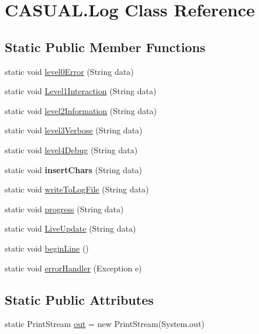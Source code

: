 \hypertarget{class_c_a_s_u_a_l_1_1_log}{\section{C\-A\-S\-U\-A\-L.\-Log Class Reference}
\label{class_c_a_s_u_a_l_1_1_log}
}
\subsection*{Static Public Member Functions}
\begin{DoxyCompactItemize}
\item 
static void \hyperlink{class_c_a_s_u_a_l_1_1_log_a3d429953109c6b954df90c113659e2c0}{level0\-Error} (String data)
\item 
static void \hyperlink{class_c_a_s_u_a_l_1_1_log_ad84575cee9a6d2f105ed8755f4066ed5}{Level1\-Interaction} (String data)
\item 
static void \hyperlink{class_c_a_s_u_a_l_1_1_log_acfb92a846f6b19f5fe5348686b2beb70}{level2\-Information} (String data)
\item 
static void \hyperlink{class_c_a_s_u_a_l_1_1_log_acfebfd3a2cec483774cab2d39e37ea37}{level3\-Verbose} (String data)
\item 
static void \hyperlink{class_c_a_s_u_a_l_1_1_log_a1f3f2f3170b2ad56737fd502b6e18684}{level4\-Debug} (String data)
\item 
\hypertarget{class_c_a_s_u_a_l_1_1_log_a459165c1edf13de49ec93b8c4eb7d87b}{static void {\bfseries insert\-Chars} (String data)}\label{class_c_a_s_u_a_l_1_1_log_a459165c1edf13de49ec93b8c4eb7d87b}

\item 
static void \hyperlink{class_c_a_s_u_a_l_1_1_log_a551763e7fc11913e4cf1cda508411ea9}{write\-To\-Log\-File} (String data)
\item 
static void \hyperlink{class_c_a_s_u_a_l_1_1_log_ad551e903653fd24471ca4e492cdff2e0}{progress} (String data)
\item 
static void \hyperlink{class_c_a_s_u_a_l_1_1_log_a4d84892b68d9aa49cccdd16904214793}{Live\-Update} (String data)
\item 
static void \hyperlink{class_c_a_s_u_a_l_1_1_log_a99364695dfc38c765bbdcf0f93fa78b7}{begin\-Line} ()
\item 
static void \hyperlink{class_c_a_s_u_a_l_1_1_log_aa180015f44c6a7405533e0e12f19f488}{error\-Handler} (Exception e)
\end{DoxyCompactItemize}
\subsection*{Static Public Attributes}
\begin{DoxyCompactItemize}
\item 
static Print\-Stream \hyperlink{class_c_a_s_u_a_l_1_1_log_a004327eeb7230d6af9f995b257a656ff}{out} = new Print\-Stream(System.\-out)
\end{DoxyCompactItemize}


